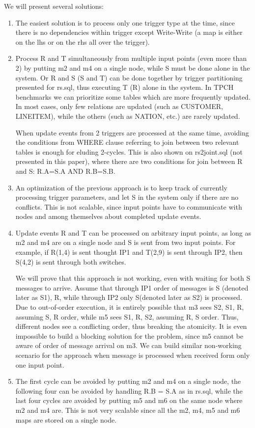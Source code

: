 \documentclass{sig-semester}
\begin{document}
We will present several solutions:
\begin{enumerate}
\item The easiest solution is to process only one trigger type at the time, since there is no dependencies within trigger except Write-Write (a map is either on the lhs or on the rhs all over the trigger).
\item Process R and T simultaneously from multiple input points (even more than 2) by putting m2 and m4 on a single node, while S must be done alone in the system. Or R and S (S and T) can be done together by trigger partitioning presented for rs.sql, thus executing T (R) alone in the system. In TPCH benchmarks we can prioritize some tables which are more frequently updated. In most cases, only few relations are updated (such as CUSTOMER, LINEITEM), while the others (such as NATION, etc.) are rarely updated.

When update events from 2 triggers are processed at the same time, avoiding the conditions from WHERE clause referring to join between two relevant tables is enough for eluding 2-cycles. This is also shown on rs2joint.sql (not presented in this paper), where there are two conditions for join between R and S: R.A=S.A AND R.B=S.B.

\item An optimization of the previous approach is to keep track of currently processing trigger parameters, and let S in the system only if there are no conflicts. This is not scalable, since input points have to communicate with nodes and among themselves about completed update events.
\item Update events R and T can be processed on arbitrary input points, as long as m2 and m4 are on a single node and S is sent from two input points. For example, if R(1,4) is sent thought IP1 and T(2,9) is sent through IP2, then S(4,2) is sent through both switches.

We will prove that this approach is not working, even with waiting for both S messages to arrive. Assume that through IP1 order of messages is S (denoted later as S1), R, while through IP2 only S(denoted later as S2) is processed. Due to out-of-order execution, it is entirely possible that m3 sees S2, S1, R, assuming S, R order, while m5 sees S1, R, S2, assuming R, S order. Thus, different nodes see a conflicting order, thus breaking the atomicity. It is even impossible to build a blocking solution for the problem, since m5 cannot be aware of order of message arrival on m3. We can build similar non-working scenario for the approach when message is processed when received form only one input point.

\item The first cycle can be avoided by putting m2 and m4 on a single node, the following four can be avoided by handling R.B = S.A as in rs.sql, while the last four cycles are avoided by putting m5 and m6 on the same node where m2 and m4 are. This is not very scalable since all the m2, m4, m5 and m6 maps are stored on a single node.
\end{enumerate}
\end{document}
